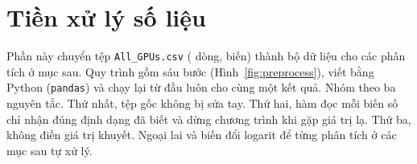 %
%   

\section{Tiền xử lý số liệu}
\label{sec:preprocessing}

Phần này chuyển tệp \texttt{All\_GPUs.csv} (\PreRowsRaw{} dòng, \PreColsRaw{} biến) thành
bộ dữ liệu cho các phân tích ở mục sau. Quy trình gồm sáu bước (Hình~\ref{fig:preprocess}),
viết bằng Python (\texttt{pandas}) và chạy lại từ đầu luôn cho cùng một kết quả. Nhóm theo
ba nguyên tắc. Thứ nhất, tệp gốc không bị sửa tay. Thứ hai, hàm đọc mỗi biến số chỉ nhận
đúng định dạng đã biết và dừng chương trình khi gặp giá trị lạ. Thứ ba, không điền giá trị
khuyết. Ngoại lai và biến đổi logarit để từng phân tích ở các mục sau tự xử lý.

